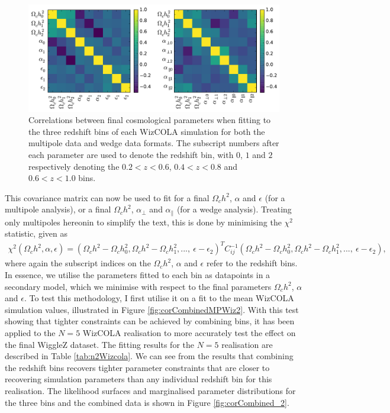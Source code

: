 \documentclass[titlesmallcaps, examinerscopy, copyrightpage]{uqthesis}
\begin{document}
\begin{figure}[h!]
  \begin{center}
    \includegraphics[width=\textwidth]{images/correlations.pdf}
  \end{center}
  \caption{Correlations between final cosmological parameters when fitting to the three redshift bins of each WizCOLA simulation for both the multipole data and wedge data formats. The subscript numbers after each parameter are used to denote the redshift bin, with $0$, $1$ and $2$ respectively denoting the $0.2 < z < 0.6$, $0.4 < z < 0.8$ and $0.6 < z < 1.0$ bins. }
  \label{fig:correlations}
\end{figure}

This covariance matrix can now be used to fit for a final $\Omega_c h^2$, $\alpha$ and $\epsilon$ (for a multipole analysis), or a final $\Omega_c h^2$, $\alpha_\perp$ and $\alpha_\parallel$ (for a wedge analysis). Treating only multipoles hereonin to simplify the text, this is done by  minimising the $\chi^2$ statistic, given as
\begin{align} \label{eq:covchi}
\chi^2(\Omega_c h^2, \alpha, \epsilon) = (\Omega_c h^2 - \Omega_c h^2_0, \Omega_c h^2 - \Omega_c h^2_1, ...,\  \epsilon - \epsilon_2)^T C_{ij}^{-1}(\Omega_c h^2 - \Omega_c h^2_0, \Omega_c h^2 - \Omega_c h^2_1, ...,\  \epsilon - \epsilon_2),
\end{align}
where again the subscript indices on the $\Omega_c h^2$, $\alpha$ and $\epsilon$ refer to the redshift bins. In essence, we utilise the parameters fitted to each bin as datapoints in a secondary model, which we minimise with respect to the final parameters $\Omega_c h^2$, $\alpha$ and $\epsilon$. To test this methodology, I first utilise it on a fit to the mean WizCOLA simulation values, illustrated in Figure \ref{fig:corCombinedMPWiz2}. With this test showing that tighter constraints can be achieved by combining bins, it has been applied to the $N=5$ WizCOLA realisation to more accurately test the effect on the final WiggleZ dataset.  The fitting results for the $N=5$ realisation are described in Table \ref{tab:n2Wizcola}. We can see from the results that combining the redshift bins recovers tighter parameter constraints that are closer to recovering simulation parameters than any individual redshift bin for this realisation. The likelihood surfaces and marginalised parameter distributions for the three bins and the combined data is shown in Figure \ref{fig:corCombined_2}.
\end{document}
